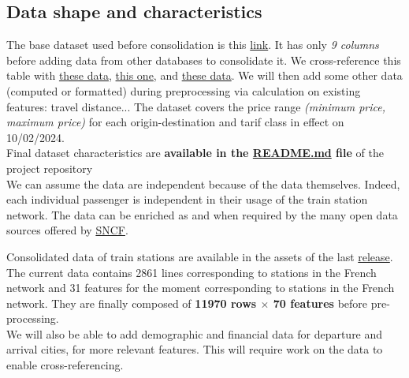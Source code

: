 \documentclass[10pt,a4paper,hidelinks]{article}
\begin{document}
\subsection{Data shape and characteristics}
The base dataset used before consolidation is this \href{https://ressources.data.sncf.com/explore/dataset/tarifs-tgv-inoui-ouigo/information/}{link}. It has only \textit{9 columns} before adding data from other databases to consolidate it. We cross-reference this table with \href{https://ressources.data.sncf.com/explore/dataset/gares-pianos/information/}{these data}, \href{https://ressources.data.sncf.com/explore/dataset/gares-equipees-du-wifi/information/}{this one}, and \href{https://ressources.data.sncf.com/explore/dataset/frequentation-gares/information/}{these data}. We will then add some other data (computed or formatted) during preprocessing via calculation on existing features: travel distance... The dataset covers the price range \textit{(minimum price, maximum price)} for each origin-destination and tarif class in effect on 10/02/2024.\\

Final dataset characteristics are \textbf{available in the \href{https://github.com/pierre-jezegou/fib-ml-project/blob/main/README.md}{README.md} file} of the project repository\\

We can assume the data are independent because of the data themselves. Indeed, each individual passenger is independent in their usage of the train station network. The data can be enriched as and when required by the many open data sources offered by \href{https://ressources.data.sncf.com/}{SNCF}.

Consolidated data of train stations are available in the assets of the last \href{https://github.com/pierre-jezegou/fib-ml-project/releases/}{release}. The current data contains 2861 lines corresponding to stations in the French network and 31 features for the moment corresponding to stations in the French network. They are finally composed of \textbf{11970 rows $\mathbf\times$ 70 features} before pre-processing.\\
We will also be able to add demographic and financial data for departure and arrival cities, for more relevant features. This will require work on the data to enable cross-referencing.
\end{document}
